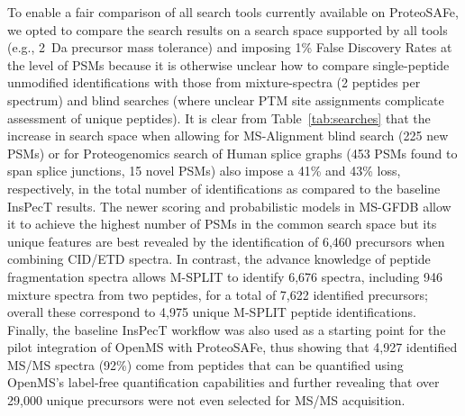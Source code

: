 \documentclass[arial,11pt]{article}
\newcommand{\SF}[1]{\textsf{#1}}
\newcommand{\SYSTEM}[0]{\SF{ProteoSAFe}\xspace}
\begin{document}
To enable a fair comparison of all search tools currently available on \SYSTEM, we opted to compare the search results on a search space supported by all tools (e.g., 2~Da precursor mass tolerance) and imposing 1\% False Discovery Rates at the level of PSMs because it is otherwise unclear how to compare single-peptide unmodified identifications with those from mixture-spectra (2 peptides per spectrum) and blind searches (where unclear PTM site assignments complicate assessment of unique peptides).
It is clear from Table~\ref{tab:searches} that the increase in search space when allowing for MS-Alignment blind search (225 new PSMs) or for Proteogenomics search of Human splice graphs (453 PSMs found to span splice junctions, 15 novel PSMs) also impose a 41\% and 43\% loss, respectively, in the total number of identifications as compared to the baseline InsPecT results. The newer scoring and probabilistic models in MS-GFDB allow it to achieve the highest number of PSMs in the common search space but its unique features are best revealed by the identification of 6,460 precursors when combining CID/ETD spectra.
In contrast, the advance knowledge of peptide fragmentation spectra allows M-SPLIT to identify 6,676 spectra, including 946 mixture spectra from two peptides, for a total of 7,622 identified precursors; overall these correspond to 4,975 unique M-SPLIT peptide identifications.
%
Finally, the baseline InsPecT workflow was also used as a starting point for the pilot integration of OpenMS with \SYSTEM, thus showing that 4,927 identified MS/MS spectra (92\%) come from peptides that can be quantified using OpenMS's label-free quantification capabilities and further revealing that over 29,000 unique precursors
were not even selected for MS/MS acquisition.
\end{document}

